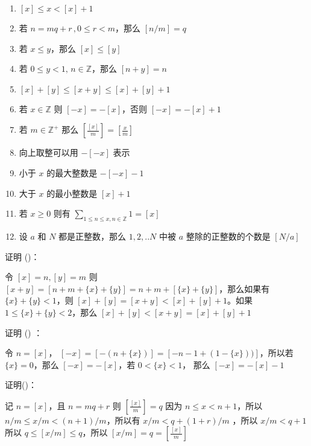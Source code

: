 \begin{enumerate}[label=(\roman*)]
    \item $[x] \le x < [x] + 1$ 
    \item 若 $n = mq + r \,,0 \le r < m $，那么 $[n/m] = q$
    \item 若 $x \le y $，那么 $[x] \le [y]$
    \item 若 $0 \le y < 1, \, n \in \mathbb{Z}$，那么 $[n + y] = n$
    \item $[x] + [y] \le [x + y] \le [x] + [y] + 1$
    \item 若 $ x \in \mathbb{Z} $ 则 $[-x] = - [x]$，否则 $[-x] = - [x]  + 1 $
    \item 若 $m \in \mathbb{Z}^+$ 那么 $[\frac{[x]}{m}]= [\frac{x}{m}]$
    \item 向上取整可以用 $-[-x]$ 表示
    \item 小于 $x$ 的最大整数是 $-[-x] - 1$
    \item 大于 $x$ 的最小整数是 $[x] + 1$
    \item 若 $x \ge 0$ 则有 $\sum_{1 \le n \le x, n \in \mathbb{Z}}1 = [x]$
    \item 设 $a$ 和 $N$ 都是正整数，那么 $1,2,..N$ 中被 $a$ 整除的正整数的个数是 $[N/a]$
\end{enumerate}



\setcounter{nproof}{5}
证明 (\nextproof)：

令 $[x] = n, [y] = m$ 则 $[x + y] = [n + m + \{x\} + \{y\}] = n + m + [\{x\} + \{y\}]$，那么如果有 
$\{x\} + \{y\} < 1$，则 $[x] + [y] = [x + y] < [x] + [y] + 1$。如果 $ 1 \le \{x\} + \{y\} < 2$，那么
$[x] + [y] < [x + y] = [x] + [y] + 1$

\newline

证明 (\nextproof) ：

令 $n = [x]$， $[-x] = [-(n + \{ x\})] = [-n - 1 + (1 - \{x\}))]$，所以若 $\{x\} = 0$，那么 $[-x] = -[x]$，若 $0 < \{x\} < 1$，
那么 $[-x] = -[x] - 1$ 

\newline

证明(\nextproof)：

记 $n = [x]$，且 $n = mq + r$ 则 $[\frac{[x]}{m}] = q$ 因为 $n \le x < n + 1$，所以 $ n/m \le x/m <(n+1)/m$，所以有 $x/m < q + (1+r)/m$ ，所以 $x/m < q + 1$
所以 $ q \le [x/m] \le q$，所以 $[x/m] = q = [\frac{[x]}{m}]$ 

\newline

